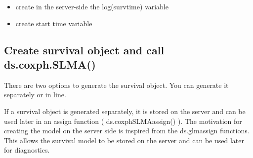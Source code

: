 \documentclass[
]{article}
\newenvironment{Shaded}{\begin{snugshade}}{\end{snugshade}}
\newcommand{\DataTypeTok}[1]{\textcolor[rgb]{0.13,0.29,0.53}{#1}}
\newcommand{\KeywordTok}[1]{\textcolor[rgb]{0.13,0.29,0.53}{\textbf{#1}}}
\newcommand{\NormalTok}[1]{#1}
\newcommand{\StringTok}[1]{\textcolor[rgb]{0.31,0.60,0.02}{#1}}
\providecommand{\tightlist}{%
  \setlength{\itemsep}{0pt}\setlength{\parskip}{0pt}}
\begin{document}
\begin{itemize}
\tightlist
\item
  create in the server-side the log(survtime) variable
\end{itemize}

\begin{Shaded}
\end{Shaded}

\begin{itemize}
\tightlist
\item
  create start time variable
\end{itemize}

\begin{Shaded}
\end{Shaded}

\hypertarget{create-survival-object-and-call-ds.coxph.slma}{%
\subsection{Create survival object and call
ds.coxph.SLMA()}\label{create-survival-object-and-call-ds.coxph.slma}}

There are two options to generate the survival object. You can generate
it separately or in line.

If a survival object is generated separately, it is stored on the server
and can be used later in an assign function ( ds.coxphSLMAassign() ).
The motivation for creating the model on the server side is inspired
from the ds.glmassign functions. This allows the survival model to be
stored on the server and can be used later for diagnostics.
\end{document}

